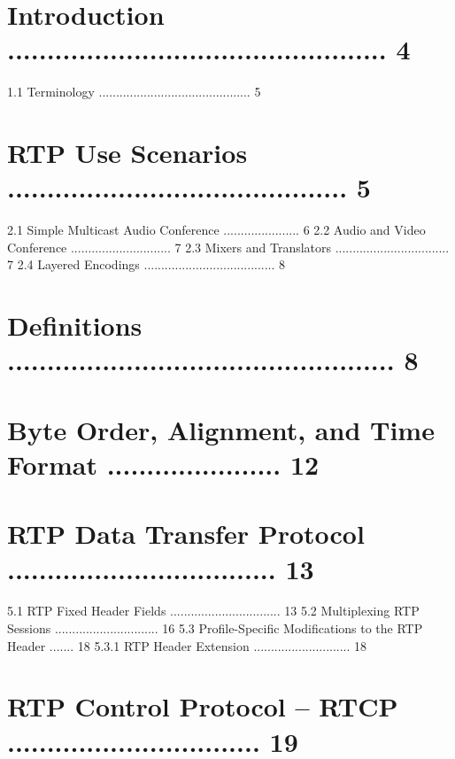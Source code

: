 \documentclass{article}
\begin{document}
\section{Introduction ................................................   4}

1.1  Terminology ............................................   5

\section{RTP Use Scenarios ...........................................   5}

2.1  Simple Multicast Audio Conference ......................   6 2.2  Audio and Video Conference .............................   7 2.3  Mixers and Translators .................................   7 2.4  Layered Encodings ......................................   8

\section{Definitions .................................................   8}

\section{Byte Order, Alignment, and Time Format ......................  12}

\section{RTP Data Transfer Protocol ..................................  13}

5.1  RTP Fixed Header Fields ................................  13 5.2  Multiplexing RTP Sessions ..............................  16 5.3  Profile-Specific Modifications to the RTP Header .......  18 5.3.1  RTP Header Extension ............................  18

\section{RTP Control Protocol -- RTCP ................................  19}
\end{document}
